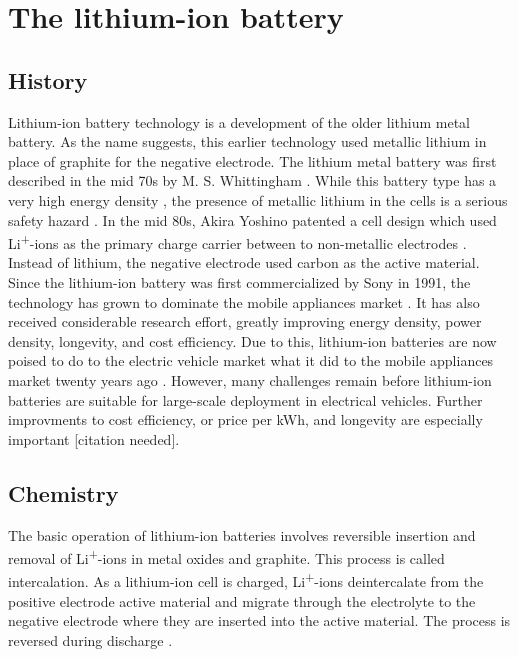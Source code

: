 \documentclass[12pt]{article} %
\begin{document}
\section{The lithium-ion battery} %


\subsection{History} %

Lithium-ion battery technology is a development of the older lithium metal battery.
As the name suggests, this earlier technology used metallic lithium in place of graphite for the negative electrode.
The lithium metal battery was first described in the mid 70s by M. S. Whittingham \cite{whittingham_electrical_1976}.
While this battery type has a very high energy density \cite{van_schalkwijk_advances_2002}, the presence of metallic lithium in the cells is a serious safety hazard \cite{lisbona_review_2011} \cite{eom_life_2007}.
In the mid 80s, Akira Yoshino patented a cell design which used Li\textsuperscript{+}-ions as the primary charge carrier between to non-metallic electrodes \cite{yoshio_lithium-ion_2009} \cite{yoshino_secondary_1987}.
Instead of lithium, the negative electrode used carbon as the active material.
Since the lithium-ion battery was first commercialized by Sony in 1991, the technology has grown to dominate the mobile appliances market \cite{yoshio_lithium-ion_2009-1}.
It has also received considerable research effort, greatly improving energy density, power density, longevity, and cost efficiency.
Due to this, lithium-ion batteries are now poised to do to the electric vehicle market what it did to the mobile appliances market twenty years ago \cite{reddy_thomas_lindens_2011}.
However, many challenges remain before lithium-ion batteries are suitable for large-scale deployment in electrical vehicles.
Further improvments to cost efficiency, or price per kWh, and longevity are especially important [citation needed].


\subsection{Chemistry} %

The basic operation of lithium-ion batteries involves reversible insertion and removal of Li\textsuperscript{+}-ions in metal oxides and graphite.
This process is called intercalation.
As a lithium-ion cell is charged, Li\textsuperscript{+}-ions deintercalate from the positive electrode active material and migrate through the electrolyte to the negative electrode where they are inserted into the active material.
The process is reversed during discharge \cite{reddy_thomas_lindens_2011-1}.
\end{document}
